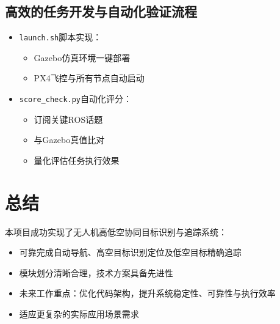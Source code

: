 \documentclass[12pt]{article}
\begin{document}
\subsection{高效的任务开发与自动化验证流程}
\begin{itemize}
    \item \texttt{launch.sh}脚本实现：
    \begin{itemize}
        \item Gazebo仿真环境一键部署
        \item PX4飞控与所有节点自动启动
    \end{itemize}
    
    \item \texttt{score\_check.py}自动化评分：
    \begin{itemize}
        \item 订阅关键ROS话题
        \item 与Gazebo真值比对
        \item 量化评估任务执行效果
    \end{itemize}
\end{itemize}

\section{总结}
本项目成功实现了无人机高低空协同目标识别与追踪系统：
\begin{itemize}
    \item 可靠完成自动导航、高空目标识别定位及低空目标精确追踪
    \item 模块划分清晰合理，技术方案具备先进性
    \item 未来工作重点：优化代码架构，提升系统稳定性、可靠性与执行效率
    \item 适应更复杂的实际应用场景需求
\end{itemize}
\end{document}
